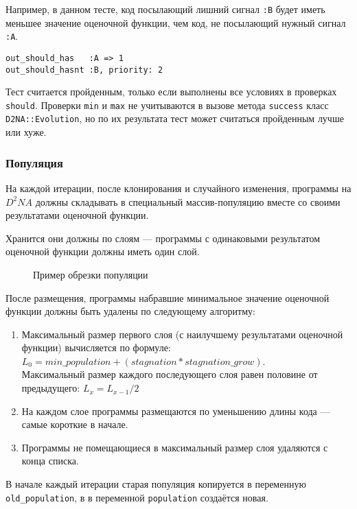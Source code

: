 \documentclass[utf8,a5paper,portrait,10pt,twoside]{eskdtext}
\begin{document}
Например, в данном тесте, код посылающий лишний сигнал \texttt{:B} будет иметь
меньшее значение оценочной функции, чем код, не посылающий нужный сигнал
\texttt{:A}.

\begin{verbatim}
out_should_has   :A => 1
out_should_hasnt :B, priority: 2
\end{verbatim}

Тест считается пройденным, только если выполнены все условиях в проверках
\texttt{should}. Проверки \texttt{min} и \texttt{max} не учитываются в вызове
метода \texttt{success} класс \texttt{D2NA::Evolution}, но по их результата
тест может считаться пройденным лучше или хуже.

\subsubsection{Популяция}

На каждой итерации, после клонирования и случайного изменения, программы на
$D^2NA$ должны складывать в специальный массив-популяцию вместе со своими
результатами оценочной функции.

Хранится они должны по слоям — программы с одинаковыми результатом оценочной
функции должны иметь один слой.


\begin{figure}
  \centering
  
  \caption{Пример обрезки популяции}
\end{figure}

После размещения, программы набравшие минимальное значение оценочной функции
должны быть удалены по следующему алгоритму:

\begin{enumerate}
  \item Максимальный размер первого слоя (с наилучшему результатами оценочной
        функции) вычисляется по формуле:\\
        $L_0 = min\_population + (stagnation * stagnation\_grow)$.\\
        Максимальный размер каждого последующего слоя равен половине от
        предыдущего: $L_{x} = L_{x-1} / 2$
  \item На каждом слое программы размещаются по уменьшению длины кода — самые
        короткие в начале.
  \item Программы не помещающиеся в максимальный размер слоя удаляются с конца
        списка.
\end{enumerate}

В начале каждый итерации старая популяция копируется в переменную
\texttt{old\_population}, в в переменной \texttt{population} создаётся новая.
\end{document}
